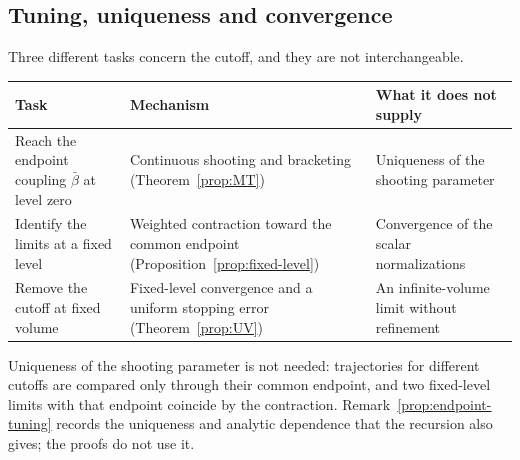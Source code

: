\subsection{Tuning, uniqueness and convergence}\label{sec:tuning-convergence}

Three different tasks concern the cutoff, and they are not interchangeable.
\begin{center}\small
\begin{tabular}{@{}p{}p{}p{}@{}}
\toprule
Task & Mechanism & What it does not supply\\
\midrule
Reach the endpoint coupling $\bar\beta$ at level zero & Continuous shooting and bracketing (Theorem~\ref{prop:MT}) & Uniqueness of the shooting parameter\\
Identify the limits at a fixed level & Weighted contraction toward the common endpoint (Proposition~\ref{prop:fixed-level}) & Convergence of the scalar normalizations\\
Remove the cutoff at fixed volume & Fixed-level convergence and a uniform stopping error (Theorem~\ref{prop:UV}) & An infinite-volume limit without refinement\\
\bottomrule
\end{tabular}
\end{center}
Uniqueness of the shooting parameter is not needed: trajectories for different cutoffs are compared only through their common endpoint, and two fixed-level limits with that endpoint coincide by the contraction. Remark~\ref{prop:endpoint-tuning} records the uniqueness and analytic dependence that the recursion also gives; the proofs do not use it.



